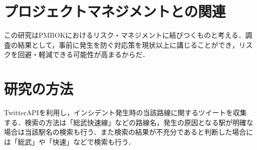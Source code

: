 \documentclass[uplatex,twocolumn,dvipdfmx]{jsarticle}
\begin{document}
\section{プロジェクトマネジメントとの関連}
この研究はPMBOKにおけるリスク・マネジメントに結びつくものと考える．調査の結果として，事前に発生を防ぐ対応策を現状以上に講じることができ，リスクを回避・軽減できる可能性が高まるからだ．


\section{研究の方法}
TwitterAPIを利用し，インシデント発生時の当該路線に関するツイートを収集する．検索の方法は「総武快速線」などの路線名，発生の原因となる駅が明確な場合は当該駅名の検索も行う．また検索の結果が不充分であると判断した場合には「総武」や「快速」などで検索も行う．



\end{document}
